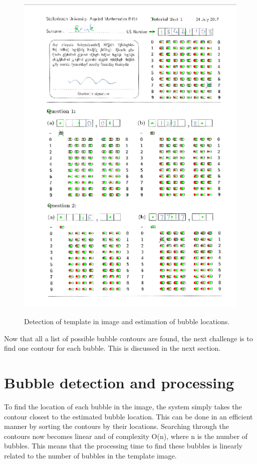 \begin{figure}
  \centering
  \includegraphics[width=14cm]{FinalEstimate}\\
  \caption{Detection of template in image and estimation of bubble locations.}
  \label{fig:FinalEstimate}
\end{figure}

Now that all a list of possible bubble contours are found, the next challenge is to find one contour for each bubble. This is discussed in the next section.

\section{Bubble detection and processing}

To find the location of each bubble in the image, the system simply takes the contour closest to the estimated bubble location. This can be done in an efficient manner by sorting the contours by their locations. Searching through the contours now becomes linear and of complexity O(n), where n is the number of bubbles. This means that the processing time to find these bubbles is linearly related to the number of bubbles in the template image. 

